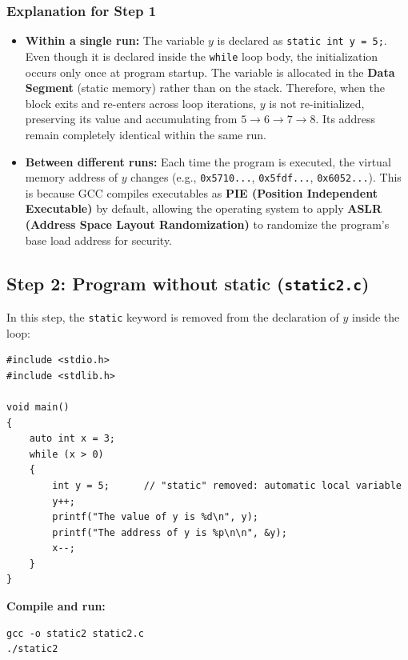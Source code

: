 \documentclass[12pt,a4paper]{article}
\begin{document}
\subsubsection*{Explanation for Step 1}
\begin{itemize}
    \item \textbf{Within a single run:} The variable $y$ is declared as \texttt{static int y = 5;}. Even though it is declared inside the \texttt{while} loop body, the initialization occurs only once at program startup. The variable is allocated in the \textbf{Data Segment} (static memory) rather than on the stack. Therefore, when the block exits and re-enters across loop iterations, $y$ is not re-initialized, preserving its value and accumulating from $5 \to 6 \to 7 \to 8$. Its address remain completely identical within the same run.
    \item \textbf{Between different runs:} Each time the program is executed, the virtual memory address of $y$ changes (e.g., \texttt{0x5710...}, \texttt{0x5fdf...}, \texttt{0x6052...}). This is because GCC compiles executables as \textbf{PIE (Position Independent Executable)} by default, allowing the operating system to apply \textbf{ASLR (Address Space Layout Randomization)} to randomize the program's base load address for security.
\end{itemize}

\subsection{Step 2: Program without static (\texttt{static2.c})}

In this step, the \texttt{static} keyword is removed from the declaration of $y$ inside the loop:

\begin{lstlisting}[style=cstyle]
#include <stdio.h>
#include <stdlib.h>

void main()
{
    auto int x = 3;
    while (x > 0)
    {
        int y = 5;      // "static" removed: automatic local variable
        y++;
        printf("The value of y is %d\n", y);
        printf("The address of y is %p\n\n", &y);
        x--;
    }
}
\end{lstlisting}

\textbf{Compile and run:}
\begin{lstlisting}[style=bashstyle]
gcc -o static2 static2.c
./static2
\end{lstlisting}
\end{document}
